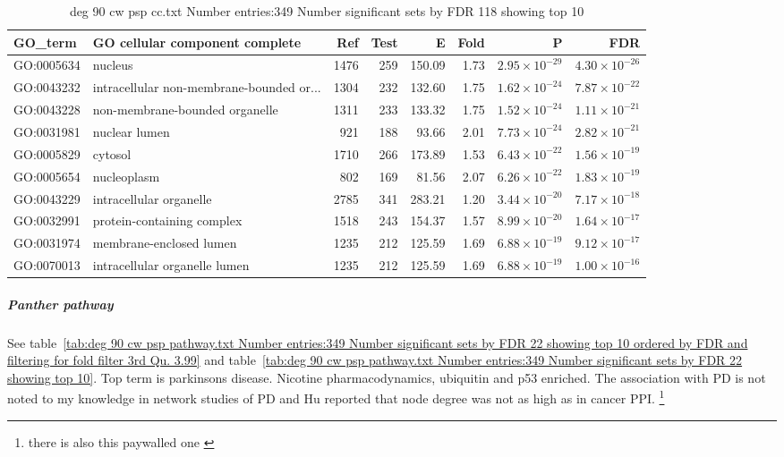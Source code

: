 \begin{table}[ht]
\centering
\begin{adjustbox}{width=\textwidth}

\begin{tabular}{llrrrrrr}
  \hline
GO\_term & GO cellular component complete & Ref & Test & E & Fold & P & FDR \\ 
  \hline
GO:0005634 & nucleus  & 1476 & 259 & 150.09 & 1.73 & $2.95 \times 10^{-29}$ & $4.30 \times 10^{-26}$ \\ 
  GO:0043232 & intracellular non-membrane-bounded or... & 1304 & 232 & 132.60 & 1.75 & $1.62 \times 10^{-24}$ & $7.87 \times 10^{-22}$ \\ 
  GO:0043228 & non-membrane-bounded organelle  & 1311 & 233 & 133.32 & 1.75 & $1.52 \times 10^{-24}$ & $1.11 \times 10^{-21}$ \\ 
  GO:0031981 & nuclear lumen  & 921 & 188 & 93.66 & 2.01 & $7.73 \times 10^{-24}$ & $2.82 \times 10^{-21}$ \\ 
  GO:0005829 & cytosol  & 1710 & 266 & 173.89 & 1.53 & $6.43 \times 10^{-22}$ & $1.56 \times 10^{-19}$ \\ 
  GO:0005654 & nucleoplasm  & 802 & 169 & 81.56 & 2.07 & $6.26 \times 10^{-22}$ & $1.83 \times 10^{-19}$ \\ 
  GO:0043229 & intracellular organelle  & 2785 & 341 & 283.21 & 1.20 & $3.44 \times 10^{-20}$ & $7.17 \times 10^{-18}$ \\ 
  GO:0032991 & protein-containing complex  & 1518 & 243 & 154.37 & 1.57 & $8.99 \times 10^{-20}$ & $1.64 \times 10^{-17}$ \\ 
  GO:0031974 & membrane-enclosed lumen  & 1235 & 212 & 125.59 & 1.69 & $6.88 \times 10^{-19}$ & $9.12 \times 10^{-17}$ \\ 
  GO:0070013 & intracellular organelle lumen  & 1235 & 212 & 125.59 & 1.69 & $6.88 \times 10^{-19}$ & $1.00 \times 10^{-16}$ \\ 
  \hline
\end{tabular}
\end{adjustbox}
\caption{deg 90 cw psp cc.txt Number entries:349 Number significant sets by FDR 118 showing top 10} 
\label{tab:deg 90 cw psp cc.txt Number entries:349 Number significant sets by FDR 118 showing top 10}
\end{table}
\subparagraph{Panther pathway}
See table~\ref{tab:deg 90 cw psp pathway.txt Number entries:349 Number significant sets by FDR 22 showing top 10 ordered by FDR and filtering for fold filter 3rd Qu. 3.99} and table~\ref{tab:deg 90 cw psp pathway.txt Number entries:349 Number significant sets by FDR 22 showing top 10}. Top term is parkinsons disease. Nicotine pharmacodynamics, ubiquitin and p53 enriched. The association with PD is not noted to my knowledge in network studies of PD \cite{siitonen2019finnish} and Hu \cite{hu2017network} reported that node degree was not as high as in cancer PPI. \footnote{there is also this paywalled one \cite{prajapati2020gene}}
